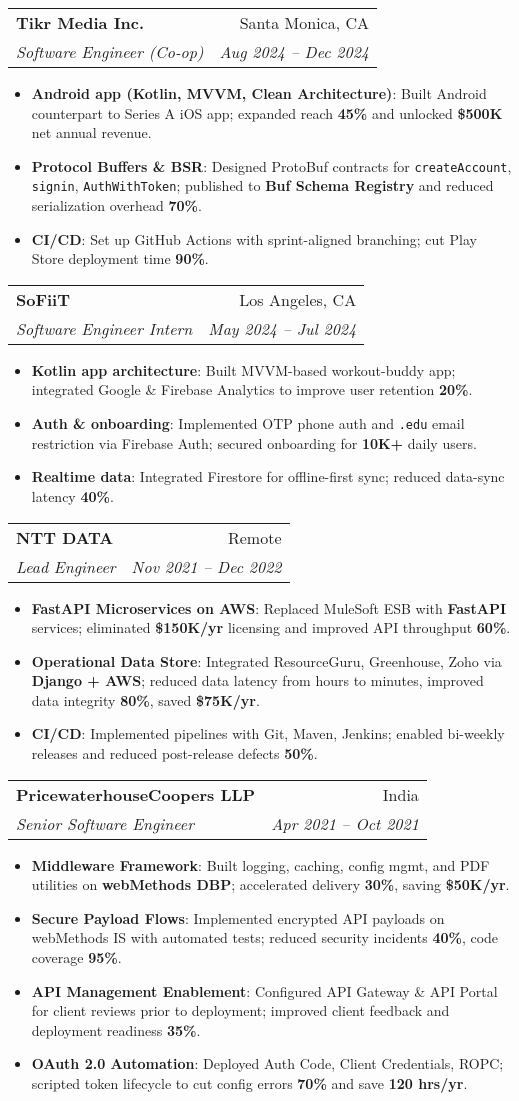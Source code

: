 \documentclass[letterpaper,11pt]{article}
\makeatletter
\newcommand{\resumeItem}[2]{\item\small{\textbf{#1}{: #2 \vspace{-2pt}}}}
\newcommand{\resumeSubheading}[4]{
  \vspace{-1pt}\item
    \begin{tabular*}{0.97\textwidth}[t]{l@{\extracolsep{\fill}}r}
      \textbf{#1} & #2 \\
      \textit{\small#3} & \textit{\small #4} \\
    \end{tabular*}\vspace{-5pt}
}
\newcommand{\resumeItemListStart}{\begin{itemize}}
\newcommand{\resumeItemListEnd}{\end{itemize}\vspace{-5pt}}
\makeatother
\begin{document}
  \resumeSubheading
    {Tikr Media Inc.}{Santa Monica, CA}
    {Software Engineer (Co-op)}{Aug 2024 -- Dec 2024}
    \resumeItemListStart
      \resumeItem{Android app (Kotlin, MVVM, Clean Architecture)}{Built Android counterpart to Series A iOS app; expanded reach \textbf{45\%} and unlocked \textbf{\$500K} net annual revenue.}
      \resumeItem{Protocol Buffers \& BSR}{Designed ProtoBuf contracts for \texttt{createAccount}, \texttt{signin}, \texttt{AuthWithToken}; published to \textbf{Buf Schema Registry} and reduced serialization overhead \textbf{70\%}.}
      \resumeItem{CI/CD}{Set up GitHub Actions with sprint-aligned branching; cut Play Store deployment time \textbf{90\%}.}
    \resumeItemListEnd

  \resumeSubheading
    {SoFiiT}{Los Angeles, CA}
    {Software Engineer Intern}{May 2024 -- Jul 2024}
    \resumeItemListStart
      \resumeItem{Kotlin app architecture}{Built MVVM-based workout-buddy app; integrated Google \& Firebase Analytics to improve user retention \textbf{20\%}.}
      \resumeItem{Auth \& onboarding}{Implemented OTP phone auth and \texttt{.edu} email restriction via Firebase Auth; secured onboarding for \textbf{10K+} daily users.}
      \resumeItem{Realtime data}{Integrated Firestore for offline-first sync; reduced data-sync latency \textbf{40\%}.}
    \resumeItemListEnd

  \resumeSubheading
    {NTT DATA}{Remote}
    {Lead Engineer}{Nov 2021 -- Dec 2022}
    \resumeItemListStart
      \resumeItem{FastAPI Microservices on AWS}{Replaced MuleSoft ESB with \textbf{FastAPI} services; eliminated \textbf{\$150K/yr} licensing and improved API throughput \textbf{60\%}.}
      \resumeItem{Operational Data Store}{Integrated ResourceGuru, Greenhouse, Zoho via \textbf{Django + AWS}; reduced data latency from hours to minutes, improved data integrity \textbf{80\%}, saved \textbf{\$75K/yr}.}
      \resumeItem{CI/CD}{Implemented pipelines with Git, Maven, Jenkins; enabled bi-weekly releases and reduced post-release defects \textbf{50\%}.}
    \resumeItemListEnd

  \resumeSubheading
    {PricewaterhouseCoopers LLP}{India}
    {Senior Software Engineer}{Apr 2021 -- Oct 2021}
    \resumeItemListStart
      \resumeItem{Middleware Framework}{Built logging, caching, config mgmt, and PDF utilities on \textbf{webMethods DBP}; accelerated delivery \textbf{30\%}, saving \textbf{\$50K/yr}.}
      \resumeItem{Secure Payload Flows}{Implemented encrypted API payloads on webMethods IS with automated tests; reduced security incidents \textbf{40\%}, code coverage \textbf{95\%}.}
      \resumeItem{API Management Enablement}{Configured API Gateway \& API Portal for client reviews prior to deployment; improved client feedback and deployment readiness \textbf{35\%}.}
      \resumeItem{OAuth 2.0 Automation}{Deployed Auth Code, Client Credentials, ROPC; scripted token lifecycle to cut config errors \textbf{70\%} and save \textbf{120 hrs/yr}.}
    \resumeItemListEnd
\end{document}
